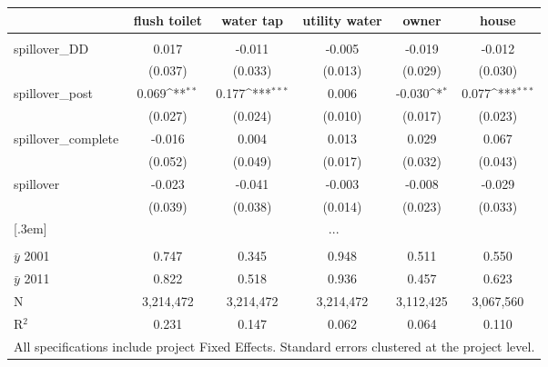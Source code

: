 {\footnotesize
{}  
\def\sym#1{\ifmmode^{#1}\else\(^{#1}\)\fi}
\begin{tabular}{l*{5}{c}}
          &\multicolumn{1}{c}{flush toilet}         &\multicolumn{1}{c}{water tap}         &\multicolumn{1}{c}{utility water}         &\multicolumn{1}{c}{owner}         &\multicolumn{1}{c}{house}         \\[0.2em]
\hline\\[-0.9em]
\rowcolor{o} spillover\_DD  &  0.017    &   -0.011     &   -0.005    &   -0.019    &   -0.012   \\
\rowcolor{o}                & (0.037)   &  (0.033)     &  (0.013)    &  (0.029)    &  (0.030)         \\
[.5em]
spillover\_post& 0.069\sym{**} &  0.177\sym{***}&  0.006    &   -0.030\sym{*}  &    0.077\sym{***}\\
               &  (0.027)      &  (0.024)       &  (0.010)  &  (0.017)         &  (0.023)  \\       
[.5em]
spillover\_complete & -0.016   &    0.004       &    0.013  &    0.029         &    0.067      \\
                    & (0.052)  &  (0.049)       &  (0.017)  &  (0.032)         &  (0.043)         \\
[.5em]
spillover &  -0.023    &   -0.041    &   -0.003    &   -0.008    &   -0.029         \\
          &  (0.039)   &  (0.038)    &  (0.014)    &  (0.023)    &  (0.033)         \\
[.3em]
& \multicolumn{5}{c}{...}\\
[.5em]
\hline \\[-0.9em]
$\bar{y}$ 2001& 0.747      &    0.345        &    0.948      &    0.511         &    0.550         \\
$\bar{y}$ 2011& 0.822      &    0.518        &    0.936      &    0.457         &    0.623         \\
N          &  3,214,472    &  3,214,472      &  3,214,472    &  3,112,425       &  3,067,560       \\
R$^{2}$    &    0.231      &    0.147        &    0.062      &    0.064         &    0.110         \\
\hline
\multicolumn{6}{l}{\tiny All specifications include project Fixed Effects. Standard errors clustered at the project level.}
\end{tabular}
}
